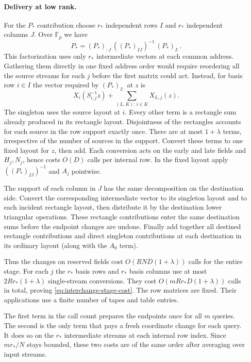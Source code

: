 \paragraph{Delivery at low rank.}
For the $P_*$ contribution choose $r_*$ independent rows $I$ and
$r_*$ independent columns $J$. Over $\mathbb F_p$ we have
\[
              P_*=(P_*)_{:J}\,((P_*)_{IJ})^{-1}\,(P_*)_{I:}.
\]
This factorization uses only $r_*$ intermediate vectors at each
common address. Gathering them directly in one fixed address order
would require reordering all the source streams for each $j$ before
the first matrix could act. Instead, for basis row $i\in I$ the
vector required by $(P_*)_{I:}$ at $z$ is
\[
          X_i(S_{i,j}^{-1}z)+
            \sum_{(L,K):\,i\in K}X_{L,j}(z).
\]
The singleton uses the source layout at $i$. Every other term is a
rectangle sum already produced in its rectangle layout. Disjointness
of the rectangles accounts for each source in the row support exactly
once. There are at most $1+\lambda$ terms, irrespective of the number
of sources in the support. Convert these terms to one fixed layout
for $z$, then add. Each conversion acts on the early and late fields
and $H_j,N_j$, hence costs $O(D)$ calls per internal row. In the
fixed layout apply $((P_*)_{IJ})^{-1}$ and $A_j$ pointwise.

The support of each column in $J$ has the same decomposition on the
destination side. Convert the corresponding intermediate vector to
its singleton layout and to each incident rectangle layout, then
distribute it by the destination lower triangular operations. These
rectangle contributions enter the same destination sums before the endpoint
changes are undone. Finally add together all destined rectangle
contributions and direct singleton contributions at each destination
in its ordinary layout (along with the $A_0$ term).

Thus the changes on reserved fields cost
$O(RND(1+\lambda))$ calls for the entire stage. For each $j$ the
$r_*$ basis rows and $r_*$ basis columns use at most
$2Rr_*(1+\lambda)$ single-stream conversions. They cost
$O(mRr_*D(1+\lambda))$ calls in total, proving
\eqref{eq:interchange-stage-cost}. The row matrices are fixed. Their applications use a finite number of tapes and table entries.


The first term in the call count prepares the endpoints once for
all $m$ queries. The second is the only term that pays a fresh
coordinate change for each query. It does so on the $r_*$ intermediate
streams at each internal row index. Since $m r_*/N$ stays bounded,
these two costs are of the same order after averaging over input
streams.

